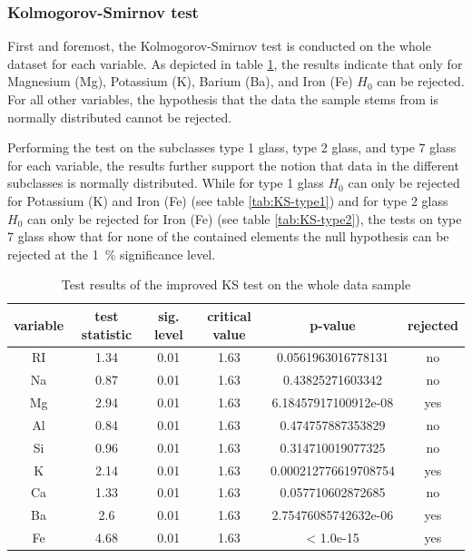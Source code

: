\documentclass[a4paper, 12pt, titlepage, headsepline, listof = totoc, bibliography = totoc, numbers = noenddot]{scrartcl}
\begin{document}
\subsubsection{Kolmogorov-Smirnov test}



First and foremost, the Kolmogorov-Smirnov test is conducted on the whole dataset for each variable. As depicted in table \ref{tab:KS-full}, the results indicate that only for Magnesium (Mg), Potassium (K), Barium (Ba), and Iron (Fe) $H_0$ can be rejected. For all other variables, the hypothesis that the data the sample stems from is normally distributed cannot be rejected.

Performing the test on the subclasses type 1 glass, type 2 glass, and type 7 glass for each variable, the results further support the notion that data in the different subclasses is normally distributed.
While for type 1 glass $H_0$ can only be rejected for Potassium (K) and Iron (Fe) (see table \ref{tab:KS-type1}) and for type 2 glass $H_0$ can only be rejected for Iron (Fe) (see table \ref{tab:KS-type2}), the tests on type 7 glass show that for none of the contained elements the null hypothesis can be rejected at the 1\, \% significance level.


\begin{table}[h!]
\centering
\begin{tabular}{|cccccc|} \hline variable & test statistic & sig. level & critical value & p-value & rejected\\ \hline RI & 1.34 & 0.01 & 1.63 & 0.0561963016778131 & no\\ 
Na & 0.87 & 0.01 & 1.63 & 0.43825271603342 & no\\ 
Mg & 2.94 & 0.01 & 1.63 & 6.18457917100912e-08 & yes\\ 
Al & 0.84 & 0.01 & 1.63 & 0.474757887353829 & no\\ 
Si & 0.96 & 0.01 & 1.63 & 0.314710019077325 & no\\ 
K & 2.14 & 0.01 & 1.63 & 0.000212776619708754 & yes\\ 
Ca & 1.33 & 0.01 & 1.63 & 0.057710602872685 & no\\ 
Ba & 2.6 & 0.01 & 1.63 & 2.75476085742632e-06 & yes\\ 
Fe & 4.68 & 0.01 & 1.63 & < 1.0e-15 & yes\\ \hline \end{tabular}\caption{Test results of the improved KS test on the whole data sample}
\label{tab:KS-full}
\end{table}
\end{document}
